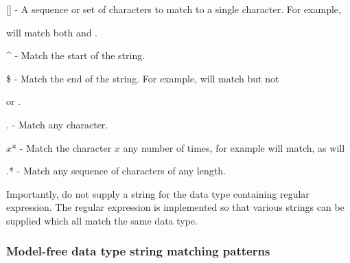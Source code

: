     [] - A sequence or set of characters to match to a single character.  For example,
    
 will match both 
 and 
.

    \^{} - Match the start of the string.

    \$ - Match the end of the string.  For example, 
 will match 
 but not 

    or 
.

    . - Match any character.

    $x$* - Match the character $x$ any number of times, for example 
 will match, as will
    


    .* - Match any sequence of characters of any length.

Importantly, do not supply a string for the data type containing regular expression.  The
regular expression is implemented so that various strings can be supplied which all match
the same data type.


\subsubsection{Model-free data type string matching patterns}



